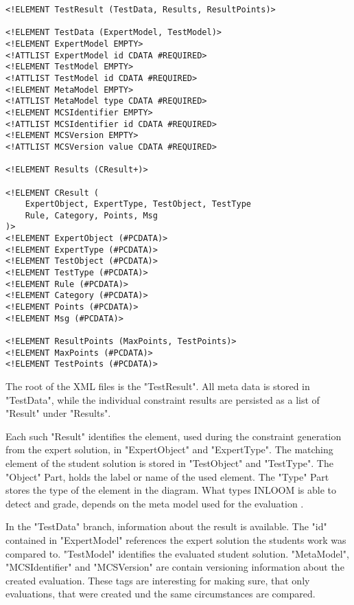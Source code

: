 \lstset{language=XML}
\begin{lstlisting}[caption={
    XML format, currently used to persist the results the INLOOM software generates.
}, captionpos=b]
<!ELEMENT TestResult (TestData, Results, ResultPoints)>

<!ELEMENT TestData (ExpertModel, TestModel)>
<!ELEMENT ExpertModel EMPTY>
<!ATTLIST ExpertModel id CDATA #REQUIRED>
<!ELEMENT TestModel EMPTY>
<!ATTLIST TestModel id CDATA #REQUIRED>
<!ELEMENT MetaModel EMPTY>
<!ATTLIST MetaModel type CDATA #REQUIRED>
<!ELEMENT MCSIdentifier EMPTY>
<!ATTLIST MCSIdentifier id CDATA #REQUIRED>
<!ELEMENT MCSVersion EMPTY>
<!ATTLIST MCSVersion value CDATA #REQUIRED>

<!ELEMENT Results (CResult+)>

<!ELEMENT CResult (
    ExpertObject, ExpertType, TestObject, TestType
    Rule, Category, Points, Msg
)>
<!ELEMENT ExpertObject (#PCDATA)>
<!ELEMENT ExpertType (#PCDATA)> 
<!ELEMENT TestObject (#PCDATA)> 
<!ELEMENT TestType (#PCDATA)>  
<!ELEMENT Rule (#PCDATA)>  
<!ELEMENT Category (#PCDATA)>  
<!ELEMENT Points (#PCDATA)>  
<!ELEMENT Msg (#PCDATA)>  

<!ELEMENT ResultPoints (MaxPoints, TestPoints)>  
<!ELEMENT MaxPoints (#PCDATA)>  
<!ELEMENT TestPoints (#PCDATA)>  
\end{lstlisting}

The root of the XML files is the "TestResult". All meta data is stored in "TestData", while
the individual constraint results are persisted as a list of "Result" under "Results".

Each such "Result" identifies the element, used during the constraint generation from the expert
solution, in "ExpertObject" and "ExpertType". The matching element of the student solution is
stored in "TestObject" and "TestType". The "Object" Part, holds the label or name of the used
element. The "Type" Part stores the type of the element in the diagram. What types INLOOM is able
to detect and grade, depends on the meta model used for the evaluation \cite{1}.

In the "TestData" branch, information about the result is available. The "id" contained in 
"ExpertModel" references the expert solution the students work was compared to. "TestModel"
identifies the evaluated student solution. "MetaModel", "MCSIdentifier" and "MCSVersion" are
contain versioning information about the created evaluation. These tags are interesting for 
making sure, that only evaluations, that were created und the same circumstances are compared.

